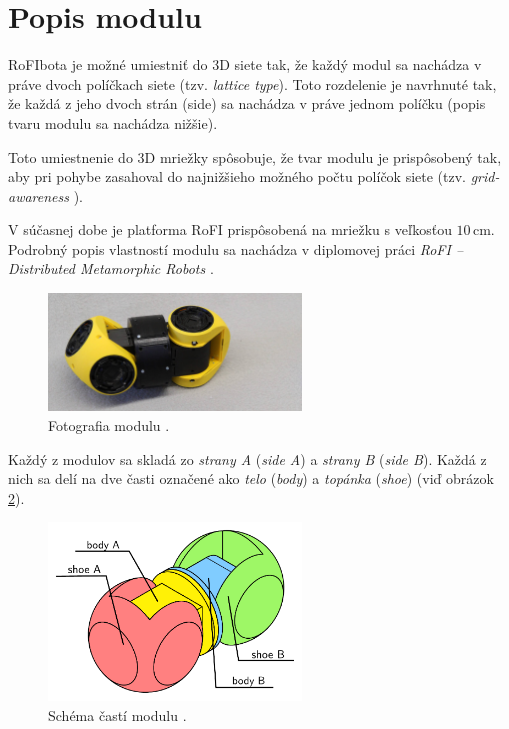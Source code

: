 \documentclass[
  digital, %
  oneside, %
  notable,   %
  lof,     %
  nolot,     %
]{fithesis3}
\begin{document}
\section{Popis modulu}
\label{sec:moduleSpec}
RoFIbota je možné umiestniť do 3D siete tak, že každý modul sa nachádza v práve dvoch políčkach siete (tzv. \textit{lattice type}). Toto rozdelenie je navrhnuté tak, že každá z jeho dvoch strán (side) sa nachádza v práve jednom políčku (popis tvaru modulu sa nachádza nižšie). 

Toto umiestnenie do 3D mriežky spôsobuje, že tvar modulu je prispôsobený tak, aby pri pohybe zasahoval do najnižšieho možného počtu políčok siete (tzv. \textit{grid-awareness} \cite{mrazekMasterThesis}). 

V súčasnej dobe je platforma RoFI prispôsobená na mriežku s veľkosťou $10$\,cm. Podrobný popis vlastností modulu sa nachádza v diplomovej práci \textit{RoFI – Distributed Metamorphic Robots} \cite{mrazekMasterThesis}. 

\begin{figure}[hbt!]
    \centering
    \includegraphics[width=0.6\textwidth]{pictures/module.jpg}
    \caption[Fotografia modulu]{Fotografia modulu \cite{rofiWeb}.}
    \label{fig:module}
\end{figure}

Každý z modulov sa skladá zo \textit{strany A} (\textit{side A}) a \textit{strany B} (\textit{side B}). Každá z nich sa delí na dve časti označené ako \textit{telo} (\textit{body}) a \textit{topánka} (\textit{shoe}) (viď obrázok \ref{fig:module_parts}). 

\begin{figure}[hbt!]
    \centering
    \includegraphics[width=0.6\textwidth]{pictures/module_parts.pdf}
    \caption[Časti modulu]{Schéma častí modulu \cite{mrazekMasterThesis}.}
    \label{fig:module_parts}
\end{figure}
\end{document}
